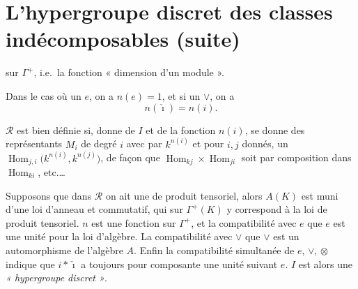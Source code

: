 \documentclass[11pt,a4paper]{article}
\begin{document}
\section*{L'hypergroupe discret des classes indécomposables (suite)}



sur $\Gamma^{+}$, i.e.\ la fonction « dimension d'un module ».


Dans le cas où \ill{} un $e$, on a $n(e) = 1$, et si \ill{} un $\vee$, on a
\[ n(\check{\imath}) = n(i) . \]

$\mathcal{R}$ est bien définie si, \ill{} donne de $I$ et de la fonction $n(i)$,
\ill{} se donne des représentants $M_{i}$ \ill{} de degré $i$ avec \ill{}
 \ill{} par $k^{n(i)}$ et pour $i, j$ donnés, un \ill{}
 $\operatorname{Hom}_{j,i}\bigl(k^{n(i)}, k^{n(j)}\bigr)$, de
façon que $\operatorname{Hom}_{kj} \times \operatorname{Hom}_{ji}$ soit \ill{}
par composition dans $\operatorname{Hom}_{ki}$, etc.\ldots

Supposons que dans $\mathcal{R}$ on ait une  de produit
tensoriel, alors $A(K)$ est muni d'une loi d'anneau \add{\ill{}}
et commutatif, qui sur $\Gamma^{+}(K)$ y correspond à la loi de produit
tensoriel. $n$ est une fonction  sur $\Gamma^{+}$, et
la compatibilité avec $e$   que $e$ est une unité
pour \ill{} la loi d'algèbre.
La compatibilité avec $\vee$   que $\vee$ est un
automorphisme de l'algèbre $A$. Enfin la compatibilité simultanée de $e$,
$\vee$, $\otimes$ indique que $i * \check{\imath}$ a toujours pour composante
une unité suivant $e$. $I$ est alors une \emph{« hypergroupe discret »}.

\end{document}
